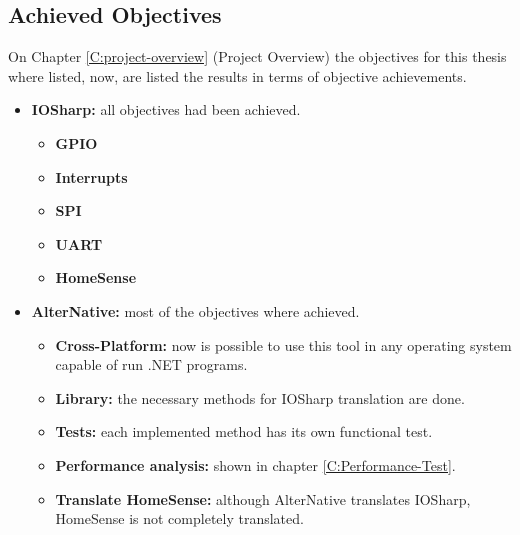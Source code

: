 \subsection{Achieved Objectives}\label{Conclusions-objectives}
On Chapter \ref{C:project-overview} (Project Overview) the objectives for this thesis where listed, now, are listed the results in terms of objective achievements.
\begin{itemize}
	\item \textbf{IOSharp:} all objectives had been achieved.
		\begin{itemize}
		\item \textbf{GPIO}
		\item \textbf{Interrupts}
		\item \textbf{SPI}
		\item \textbf{UART}
		\item \textbf{HomeSense}
		\end{itemize}
	\item \textbf{AlterNative:} most of the objectives where achieved.
		\begin{itemize}
		\item \textbf{Cross-Platform:} now is possible to use this tool in any operating system capable of run .NET programs.
		\item \textbf{Library:} the necessary methods for IOSharp translation are done.
		\item \textbf{Tests:} each implemented method has its own functional test.
		\item \textbf{Performance analysis:} shown in chapter \ref{C:Performance-Test}.
		\item \textbf{Translate HomeSense:} although AlterNative translates IOSharp, HomeSense is not completely translated.
		\end{itemize}
\end{itemize}

